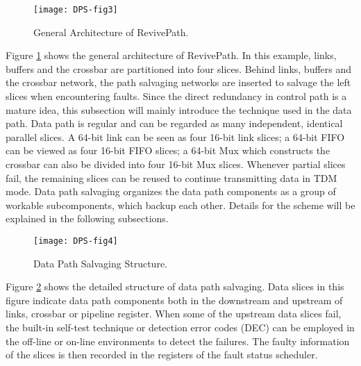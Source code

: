 \begin{figure}[h]
      \centering
        \texttt{[image: DPS-fig3]}
        \caption{General Architecture of RevivePath.}
        \label{fig:dps-fig3}
\end{figure}


Figure \ref{fig:dps-fig3} shows the general architecture of RevivePath. In this example, links, buffers and the crossbar are partitioned into four slices. Behind links, buffers and the crossbar network, the path salvaging networks are inserted to salvage the left slices when encountering faults. Since the direct redundancy in control path is a mature idea, this subsection will mainly introduce the technique used in the data path. Data path is regular and can be regarded as many independent, identical parallel slices. A 64-bit link can be seen as four 16-bit link slices; a 64-bit FIFO can be viewed as four 16-bit FIFO slices; a 64-bit Mux which constructs the crossbar can also be divided into four 16-bit Mux slices. Whenever partial slices fail, the remaining slices can be reused to continue transmitting data in TDM mode. Data path salvaging organizes the data path components as a group of workable subcomponents, which backup each other. Details for the scheme will be explained in the following subsections.

\begin{figure}[h]
      \centering
        \texttt{[image: DPS-fig4]}
        \caption{Data Path Salvaging Structure.}
        \label{fig:dps-fig4}
\end{figure}


Figure \ref{fig:dps-fig4} shows the detailed structure of data path salvaging. Data slices in this figure indicate data path components both in the downstream and upstream of links, crossbar or pipeline register. When some of the upstream data slices fail, the built-in self-test technique \cite{fick2009highly} \cite{alaghi2007online} or detection error codes (DEC) can be employed in the off-line or on-line environments to detect the failures. The faulty information of the slices is then recorded in the registers of the fault status scheduler.

